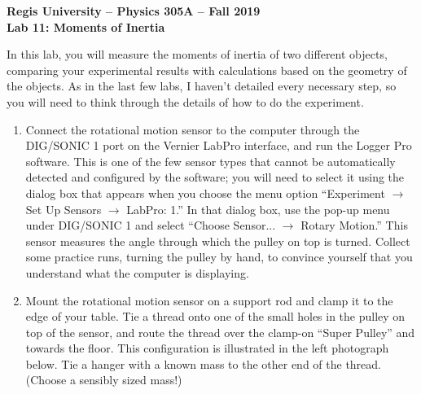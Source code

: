 \documentclass[11pt]{article}
\begin{document}
\begin{center}
{\bf{Regis University -- Physics 305A -- Fall 2019}} \\
{\bf{Lab 11: Moments of Inertia}} \\
\end{center}

In this lab, you will measure the moments of inertia of two different
objects, comparing your experimental results with calculations based on
the geometry of the objects.  As in the last few labs, I haven't detailed every necessary step, so you will need to 
think through the details of how to do the experiment.

\bigskip

\begin{enumerate}
\item Connect the rotational motion sensor to the computer through 
the DIG/SONIC 1 port on the Vernier LabPro interface, and run the 
Logger Pro software.  This is one of the few sensor types that cannot be 
automatically detected and configured by the software; you will need to 
select it using the dialog box that appears when you choose the menu option
``Experiment $\rightarrow$ Set Up Sensors $\rightarrow$ LabPro: 1.''  
In that dialog box, use the pop-up menu under DIG/SONIC 1 and 
select ``Choose Sensor... $\rightarrow$ Rotary Motion.''
This sensor measures the angle through which the pulley on top is turned.  
Collect some practice runs, turning the pulley by hand, to convince yourself 
that you understand what the computer is displaying.
\item Mount the rotational motion sensor on a support rod and clamp it to 
the edge of your table.  Tie a thread onto one of the small holes in the 
pulley on top of the sensor, and route the thread
over the clamp-on ``Super Pulley'' and towards the floor.  This configuration 
is illustrated in the left photograph below.  Tie a hanger with a known mass 
to the other end of the thread. (Choose a sensibly sized mass!)
\begin{center}

\end{center}
\end{enumerate}
\end{document}
